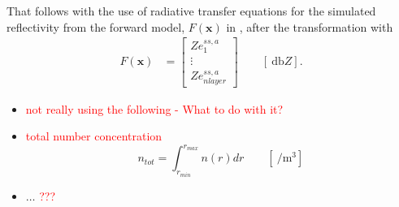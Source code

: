 That follows with the use of radiative transfer equations for the simulated reflectivity from the forward model, $F(\mathbf{x})$ in , after the transformation with 
\begin{align}
F(\mathbf{x}) & = \begin{bmatrix} 
Ze^{ss,a}_1 \\
\vdots \\
Ze^{ss,a}_{nlayer}
\end{bmatrix} \qquad [\SI{}{\decibel Z}]. \label{eq:forward_model}
\end{align}


\begin{itemize}
	\item \textcolor{red}{not really using the following - What to do with it?}
	\item \textcolor{red}{total number concentration} \\
	$$n_{tot} = \int_{r_{min}}^{r_{max}} n(r) dr \qquad [\SI{}{\per\cubic\metre}]$$ 
	\item $\ldots$ \textcolor{red}{??? }
	
\end{itemize}



